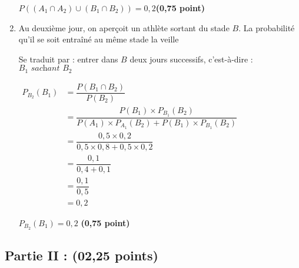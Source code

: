\documentclass[12pt,a4paper]{article}
\begin{document}
\begin{enumerate}
          \begin{center}
              $\boxed{P((A_1\cap A_2) \cup (B_1\cap B_2))=0,2}$\hfill \textbf{(0,75 point)}
          \end{center}

    \item Au deuxième jour, on aperçoit un athlète sortant du stade \( B \). La probabilité qu’il se soit entraîné au même stade la veille

          Se traduit par : entrer dans \( B \) deux jours successifs, c’est-à-dire : \( B_1 \textit{ sachant } B_2 \)

          \(
          \begin{aligned}
              P_{B_2}(B_1) & = \dfrac{P(B_1 \cap B_2)}{P(B_2)}                                                             \\
                           & = \dfrac{P(B_1) \times P_{B_1}(B_2)}{P(A_1) \times P_{A_1}(B_2) + P(B_1) \times P_{B_1}(B_2)} \\
                           & = \dfrac{0,5 \times 0,2}{0,5 \times 0,8 + 0,5 \times 0,2}                                     \\
                           & = \dfrac{0,1}{0,4 + 0,1}                                                                      \\
                           & = \dfrac{0,1}{0,5}                                                                            \\
                           & = 0,2
          \end{aligned}
          \)

          \begin{center}
              \(\boxed{P_{B_2}(B_1) = 0,2}\) \hfill \textbf{(0,75 point)}
          \end{center}



\end{enumerate}

\subsection*{Partie II :  (02,25 points)}
\end{document}
